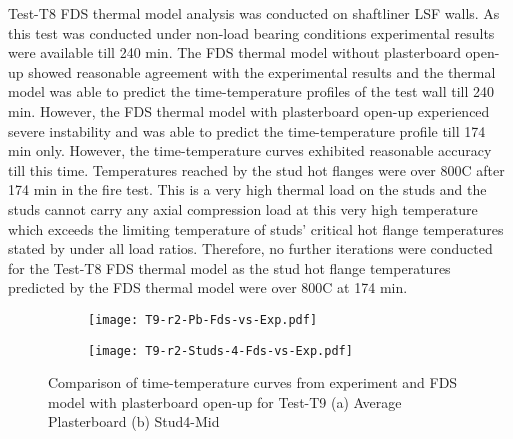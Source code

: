 Test-T8 FDS thermal model analysis was conducted on shaftliner LSF walls. As this test was conducted under non-load bearing conditions experimental results were available till 240 min. The FDS thermal model without plasterboard open-up showed reasonable agreement with the experimental results and the thermal model was able to predict the time-temperature profiles of the test wall till 240 min. However, the FDS thermal model with plasterboard open-up experienced severe instability and was able to predict the time-temperature profile till 174 min only. However, the time-temperature curves exhibited reasonable accuracy till this time. Temperatures reached by the stud hot flanges were over 800\degree C after 174 min in the fire test. This is a very high thermal load on the studs and the studs cannot carry any axial compression load at this very high temperature which exceeds the limiting temperature of studs' critical hot flange temperatures stated by \citet{Gunalan2013a} under all load ratios. Therefore, no further iterations were conducted for the Test-T8 FDS thermal model as the stud hot flange temperatures predicted by the FDS thermal model were over 800\degree C at 174 min.   
\begin{figure}[!htbp]
	\centering
	\begin{subfigure}[b]{0.7\textwidth}
		\centering
		\texttt{[image: T9-r2-Pb-Fds-vs-Exp.pdf]}
		\caption{}
		\label{subfig:T9-r2-Pb-Fds-vs-Exp}
	\end{subfigure}
	\begin{subfigure}[b]{0.6\textwidth}
		\centering
		\texttt{[image: T9-r2-Studs-4-Fds-vs-Exp.pdf]}
		\caption{}
		\label{subfig:T9-r2-Studs-4-Fds-vs-Exp}
	\end{subfigure}
	   \caption{Comparison of time-temperature curves from experiment and FDS model with plasterboard open-up for Test-T9 (a) Average Plasterboard (b) Stud4-Mid}
	   \label{fig:T9-fds-output-pbop}
\end{figure}

